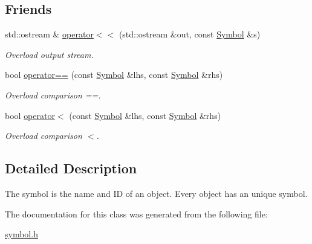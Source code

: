 \subsection*{Friends}
\begin{DoxyCompactItemize}
\item 
\mbox{\label{classilang_1_1_symbol_a040d792e691cdd02f09b8411b9b141ac}} 
std\+::ostream \& \mbox{\hyperlink{classilang_1_1_symbol_a040d792e691cdd02f09b8411b9b141ac}{operator$<$$<$}} (std\+::ostream \&out, const \mbox{\hyperlink{classilang_1_1_symbol}{Symbol}} \&s)
\begin{DoxyCompactList}\small\item\em Overload output stream. \end{DoxyCompactList}\item 
\mbox{\label{classilang_1_1_symbol_ab8f8bc25ef0f5bca1641e9c8c160fe7d}} 
bool \mbox{\hyperlink{classilang_1_1_symbol_ab8f8bc25ef0f5bca1641e9c8c160fe7d}{operator==}} (const \mbox{\hyperlink{classilang_1_1_symbol}{Symbol}} \&lhs, const \mbox{\hyperlink{classilang_1_1_symbol}{Symbol}} \&rhs)
\begin{DoxyCompactList}\small\item\em Overload comparison ==. \end{DoxyCompactList}\item 
\mbox{\label{classilang_1_1_symbol_a522e7c09469c187f1e39140f5cb71bc5}} 
bool \mbox{\hyperlink{classilang_1_1_symbol_a522e7c09469c187f1e39140f5cb71bc5}{operator$<$}} (const \mbox{\hyperlink{classilang_1_1_symbol}{Symbol}} \&lhs, const \mbox{\hyperlink{classilang_1_1_symbol}{Symbol}} \&rhs)
\begin{DoxyCompactList}\small\item\em Overload comparison $<$. \end{DoxyCompactList}\end{DoxyCompactItemize}


\subsection{Detailed Description}
The symbol is the name and ID of an object. Every object has an unique symbol. 

The documentation for this class was generated from the following file\+:\begin{DoxyCompactItemize}
\item 
\mbox{\hyperlink{symbol_8h}{symbol.\+h}}\end{DoxyCompactItemize}
